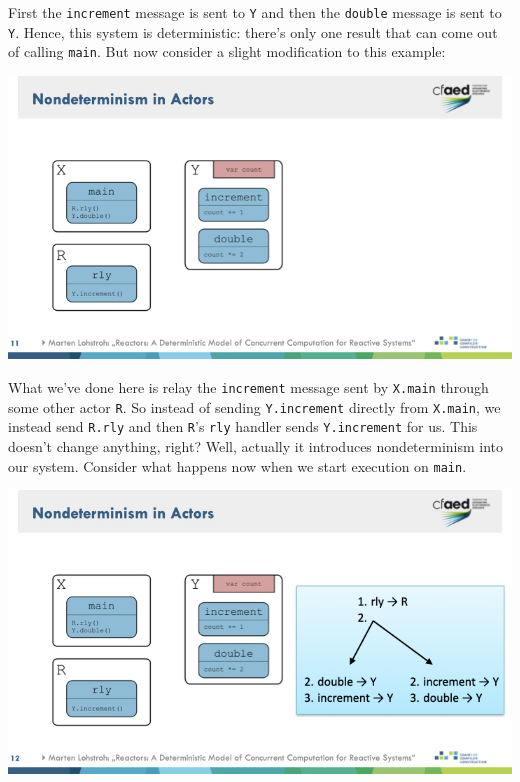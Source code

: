 \documentclass{article}
\begin{document}
First the \verb|increment| message is sent to \verb|Y| and then the \verb|double| message is sent to \verb|Y|.
Hence, this system is deterministic: there's only one result that can come out of calling \verb|main|.
But now consider a slight modification to this example:

\begin{center}
    \includegraphics[width=\columnwidth]{Slides/Slide 11.jpeg}
\end{center}

What we've done here is relay the \verb|increment| message sent by \verb|X.main| through some other actor \verb|R|.
So instead of sending \verb|Y.increment| directly from \verb|X.main|, we instead send \verb|R.rly| and then \verb|R|'s \verb|rly| handler sends \verb|Y.increment| for us.
This doesn't change anything, right?
Well, actually it introduces nondeterminism into our system.
Consider what happens now when we start execution on \verb|main|.

\begin{center}
    \includegraphics[width=\columnwidth]{Slides/Slide 12.jpeg}
\end{center}
\end{document}
